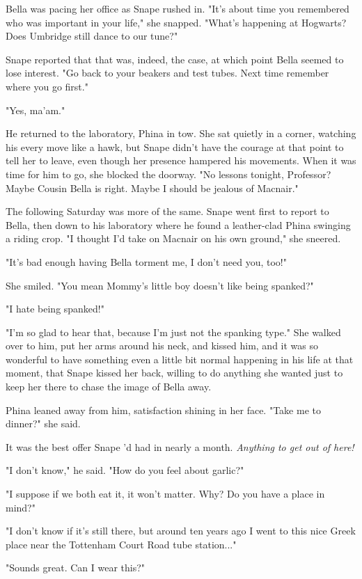 \documentclass[a4paper,11pt]{article}
\begin{document}
Bella was pacing her office as Snape rushed in. "It's about time you remembered who was important in your life," she snapped. "What's happening at Hogwarts? Does Umbridge still dance to our tune?"

Snape reported that that was, indeed, the case, at which point Bella seemed to lose interest. "Go back to your beakers and test tubes. Next time remember where you go first."

"Yes, ma'am."

He returned to the laboratory, Phina in tow. She sat quietly in a corner, watching his every move like a hawk, but Snape didn't have the courage at that point to tell her to leave, even though her presence hampered his movements. When it was time for him to go, she blocked the doorway. "No lessons tonight, Professor? Maybe Cousin Bella is right. Maybe I should be jealous of Macnair."

The following Saturday was more of the same. Snape went first to report to Bella, then down to his laboratory where he found a leather-clad Phina swinging a riding crop. "I thought I'd take on Macnair on his own ground," she sneered.

"It's bad enough having Bella torment me, I don't need you, too!"

She smiled. "You mean Mommy's little boy doesn't like being spanked?"

"I hate being spanked!"

"I'm so glad to hear that, because I'm just not the spanking type." She walked over to him, put her arms around his neck, and kissed him, and it was so wonderful to have something even a little bit normal happening in his life at that moment, that Snape kissed her back, willing to do anything she wanted just to keep her there to chase the image of Bella away.

Phina leaned away from him, satisfaction shining in her face. "Take me to dinner?" she said.

It was the best offer Snape 'd had in nearly a month. \emph{Anything to get out of here!}

"I don't know," he said. "How do you feel about garlic?"

"I suppose if we both eat it, it won't matter. Why? Do you have a place in mind?"

"I don't know if it's still there, but around ten years ago I went to this nice Greek place near the Tottenham Court Road tube station..."

"Sounds great. Can I wear this?"
\end{document}

